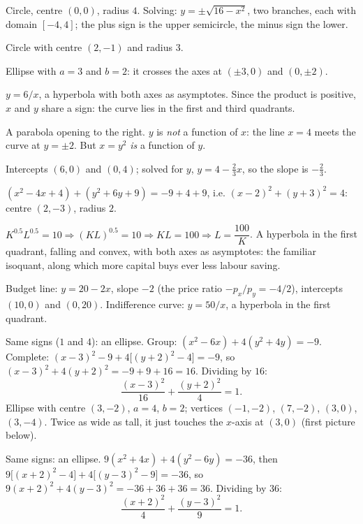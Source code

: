 \begin{solutions}
  \item Circle, centre $(0,0)$, radius $4$. Solving:
        $y=\pm\sqrt{16-x^{2}}$, two branches, each with domain $[-4,4]$;
        the plus sign is the upper semicircle, the minus sign the lower.
  \item Circle with centre $(2,-1)$ and radius $3$.
  \item Ellipse with $a=3$ and $b=2$: it crosses the axes at
        $(\pm3,0)$ and $(0,\pm2)$.
  \item $y=6/x$, a hyperbola with both axes as asymptotes. Since the
        product is positive, $x$ and $y$ share a sign: the curve lies in
        the first and third quadrants.
  \item A parabola opening to the right. $y$ is \emph{not} a function of
        $x$: the line $x=4$ meets the curve at $y=\pm2$. But $x=y^{2}$
        \emph{is} a function of $y$.
  \item Intercepts $(6,0)$ and $(0,4)$; solved for $y$,
        $y=4-\tfrac23 x$, so the slope is $-\tfrac23$.
  \item $(x^{2}-4x+4)+(y^{2}+6y+9)=-9+4+9$, i.e.
        $(x-2)^{2}+(y+3)^{2}=4$: centre $(2,-3)$, radius $2$.
  \item $K^{0.5}L^{0.5}=10\Rightarrow (KL)^{0.5}=10\Rightarrow KL=100
        \Rightarrow L=\dfrac{100}{K}$. A hyperbola in the first quadrant,
        falling and convex, with both axes as asymptotes: the familiar
        isoquant, along which more capital buys ever less labour saving.
  \item Budget line: $y=20-2x$, slope $-2$ (the price ratio
        $-p_{x}/p_{y}=-4/2$), intercepts $(10,0)$ and $(0,20)$.
        Indifference curve: $y=50/x$, a hyperbola in the first quadrant.
  \item Same signs ($1$ and $4$): an ellipse. Group:
        $(x^{2}-6x)+4(y^{2}+4y)=-9$. Complete:
        $(x-3)^{2}-9+4\bigl[(y+2)^{2}-4\bigr]=-9$, so
        $(x-3)^{2}+4(y+2)^{2}=-9+9+16=16$. Dividing by $16$:
        \[
          \frac{(x-3)^{2}}{16}+\frac{(y+2)^{2}}{4}=1 .
        \]
        Ellipse with centre $(3,-2)$, $a=4$, $b=2$; vertices $(-1,-2)$,
        $(7,-2)$, $(3,0)$, $(3,-4)$. Twice as wide as tall, it just touches
        the $x$-axis at $(3,0)$ (first picture below).
  \item Same signs: an ellipse. $9(x^{2}+4x)+4(y^{2}-6y)=-36$, then
        $9\bigl[(x+2)^{2}-4\bigr]+4\bigl[(y-3)^{2}-9\bigr]=-36$, so
        $9(x+2)^{2}+4(y-3)^{2}=-36+36+36=36$. Dividing by $36$:
        \[
          \frac{(x+2)^{2}}{4}+\frac{(y-3)^{2}}{9}=1 .
\]
\end{solutions}
